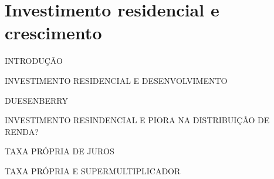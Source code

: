 \section{Investimento residencial e crescimento}

INTRODUÇÃO

INVESTIMENTO RESIDENCIAL E DESENVOLVIMENTO

DUESENBERRY

INVESTIMENTO RESINDENCIAL E PIORA NA DISTRIBUIÇÃO DE RENDA?

TAXA PRÓPRIA DE JUROS

TAXA PRÓPRIA E SUPERMULTIPLICADOR